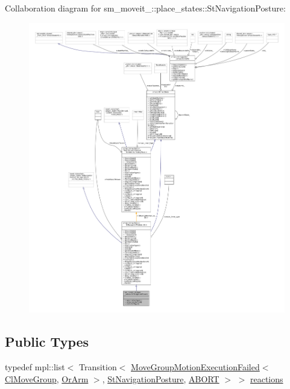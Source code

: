 Collaboration diagram for sm\+\_\+moveit\+\_\+:\+:place\+\_\+states\+:\+:St\+Navigation\+Posture\+:
\nopagebreak
\begin{figure}[H]
\begin{center}
\leavevmode
\includegraphics[width=350pt]{structsm__moveit__4_1_1place__states_1_1StNavigationPosture__coll__graph}
\end{center}
\end{figure}
\subsection*{Public Types}
\begin{DoxyCompactItemize}
\item 
typedef mpl\+::list$<$ Transition$<$ \hyperlink{structmoveit__z__client_1_1MoveGroupMotionExecutionFailed}{Move\+Group\+Motion\+Execution\+Failed}$<$ \hyperlink{classmoveit__z__client_1_1ClMoveGroup}{Cl\+Move\+Group}, \hyperlink{classsm__moveit__4_1_1OrArm}{Or\+Arm} $>$, \hyperlink{structsm__moveit__4_1_1place__states_1_1StNavigationPosture}{St\+Navigation\+Posture}, \hyperlink{classABORT}{A\+B\+O\+RT} $>$ $>$ \hyperlink{structsm__moveit__4_1_1place__states_1_1StNavigationPosture_a2588352d77d56f7a1f3df49fe37629d4}{reactions}
\end{DoxyCompactItemize}
